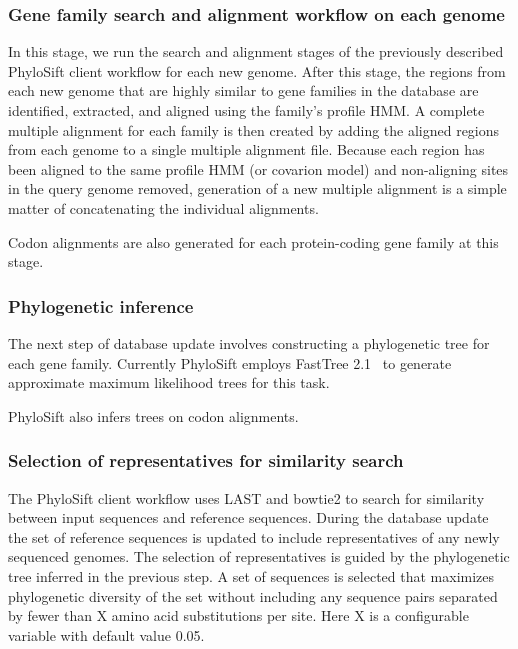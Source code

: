 \documentclass[10pt]{article}
\begin{document}
\subsubsection*{Gene family search and alignment workflow on each genome}
In this stage, we run the search and alignment stages of the previously described PhyloSift client workflow for each new genome.
After this stage, the regions from each new genome that are highly similar to gene families in the database are identified, extracted, and aligned using the family's profile HMM.
A complete multiple alignment for each family is then created by adding the aligned regions from each genome to a single multiple alignment file.
Because each region has been aligned to the same profile HMM (or covarion model) and non-aligning sites in the query genome removed, generation of a new multiple alignment is a simple matter of concatenating the individual alignments.

Codon alignments are also generated for each protein-coding gene family at this stage.
\subsubsection*{Phylogenetic inference}
The next step of database update involves constructing a phylogenetic tree for each gene family.
Currently PhyloSift employs FastTree 2.1~\cite{PriceFastTree} to generate approximate maximum likelihood trees for this task.

PhyloSift also infers trees on codon alignments. 

\subsubsection*{Selection of representatives for similarity search}
The PhyloSift client workflow uses LAST and bowtie2 to search for similarity between input sequences and reference sequences.
During the database update the set of reference sequences is updated to include representatives of any newly sequenced genomes.
The selection of representatives is guided by the phylogenetic tree inferred in the previous step.
A set of sequences is selected that maximizes phylogenetic diversity of the set without including any sequence pairs separated by fewer than X amino acid substitutions per site.
Here X is a configurable variable with default value 0.05.
\end{document}
